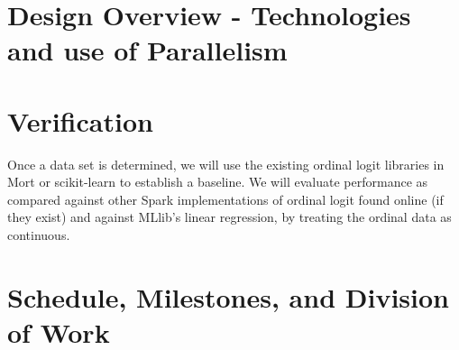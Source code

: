 \documentclass{article}
\begin{document}
	\section{Design Overview - Technologies and use of Parallelism}

	\section{Verification}
	Once a data set is determined, we will use the existing ordinal logit libraries in Mort or scikit-learn to establish a baseline. We will evaluate performance as compared against other Spark implementations of ordinal logit found online (if they exist) and against MLlib's linear regression, by treating the ordinal data as continuous. 

	\section{Schedule, Milestones, and Division of Work}
\end{document}
